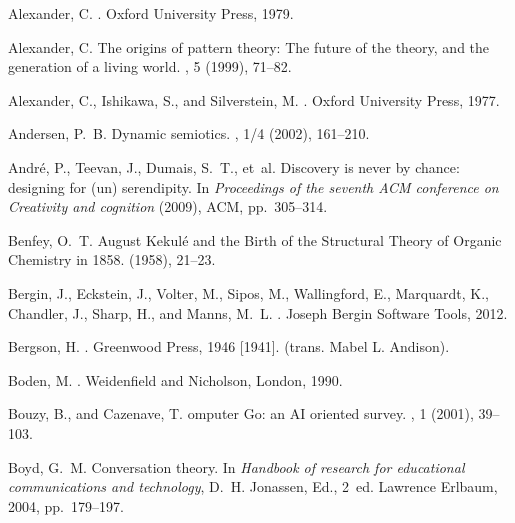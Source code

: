 \begin{thebibliography}{10}

{\sc Alexander, C.}
.
\newblock Oxford University Press, 1979.

{\sc Alexander, C.}
\newblock The origins of pattern theory: {T}he future of the theory, and the
  generation of a living world.
, 5 (1999), 71--82.

{\sc Alexander, C., Ishikawa, S., and Silverstein, M.}
.
\newblock Oxford University Press, 1977.

{\sc Andersen, P.~B.}
\newblock Dynamic semiotics.
, 1/4 (2002), 161--210.

{\sc Andr{\'e}, P., Teevan, J., Dumais, S.~T., et~al.}
\newblock Discovery is never by chance: designing for (un) serendipity.
\newblock In {\em Proceedings of the seventh ACM conference on Creativity and
  cognition\/} (2009), ACM, pp.~305--314.

{\sc Benfey, O.~T.}
\newblock August {K}ekul\'e and the {B}irth of the {S}tructural {T}heory of
  {O}rganic {C}hemistry in 1858.
 (1958), 21--23.

{\sc Bergin, J., Eckstein, J., Volter, M., Sipos, M., Wallingford, E.,
  Marquardt, K., Chandler, J., Sharp, H., and Manns, M.~L.}
.
\newblock Joseph Bergin Software Tools, 2012.

{\sc Bergson, H.}
.
\newblock Greenwood Press, 1946 [1941].
\newblock (trans. Mabel L. Andison).

{\sc Boden, M.}
.
\newblock Weidenfield and Nicholson, London, 1990.

{\sc Bouzy, B., and Cazenave, T.}
omputer {G}o: an {AI} oriented survey.
, 1 (2001), 39--103.

{\sc Boyd, G.~M.}
\newblock Conversation theory.
\newblock In {\em Handbook of research for educational communications and
  technology}, D.~H. Jonassen, Ed., 2~ed. Lawrence Erlbaum, 2004, pp.~179--197.


\end{thebibliography}
